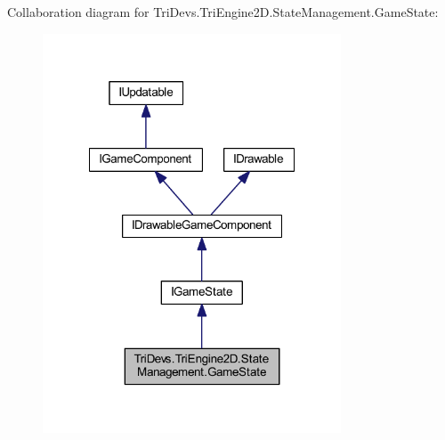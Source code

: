 Collaboration diagram for Tri\-Devs.\-Tri\-Engine2\-D.\-State\-Management.\-Game\-State\-:
\nopagebreak
\begin{figure}[H]
\begin{center}
\leavevmode
\includegraphics[width=251pt]{class_tri_devs_1_1_tri_engine2_d_1_1_state_management_1_1_game_state__coll__graph}
\end{center}
\end{figure}
